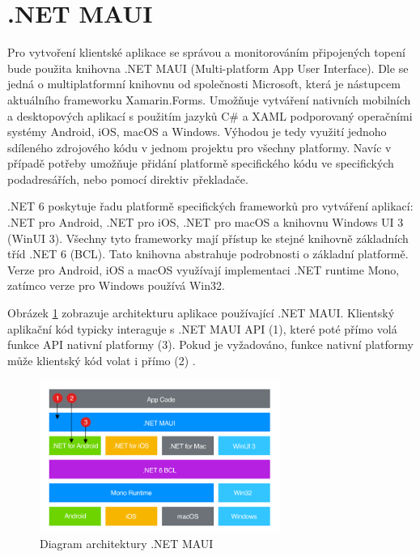 \pagebreak

\section{.NET MAUI}
Pro vytvoření klientské aplikace se správou a monitorováním připojených topení bude použita knihovna .NET MAUI (Multi-platform App User Interface). Dle \cite{maui} se jedná o multiplatformní knihovnu od společnosti Microsoft, která je nástupcem aktuálního frameworku Xamarin.Forms. Umožňuje vytváření nativních mobilních a desktopových aplikací s použitím jazyků C\# a XAML podporovaný operačními systémy Android, iOS, macOS a Windows. Výhodou je tedy využití jednoho sdíleného zdrojového kódu v jednom projektu pro všechny platformy. Navíc v případě potřeby umožňuje přidání platformě specifického kódu ve specifických podadresářích, nebo pomocí direktiv překladače.

.NET 6 poskytuje řadu platformě specifických frameworků pro vytváření aplikací: .NET pro Android, .NET pro iOS, .NET pro macOS a knihovnu Windows UI 3 (WinUI 3). Všechny tyto frameworky mají přístup ke stejné knihovně základních tříd .NET 6 (BCL). Tato knihovna abstrahuje podrobnosti o základní platformě. Verze pro Android, iOS a macOS využívají implementaci .NET runtime Mono, zatímco verze pro Windows používá Win32.

Obrázek \ref{mauiArchitectureDiagra} zobrazuje architekturu aplikace používající .NET MAUI. Klientský aplikační kód typicky interaguje s .NET MAUI API (1), které poté přímo volá funkce API nativní platformy (3). Pokud je vyžadováno, funkce nativní platformy může klientský kód volat i přímo (2) \cite{maui}.

\begin{figure}[hbt]
\centering
\includegraphics[width=0.7\textwidth]{obrazky-figures/maui-architecture.png}
\caption{Diagram architektury .NET MAUI}
\label{mauiArchitectureDiagra}
\end{figure}


